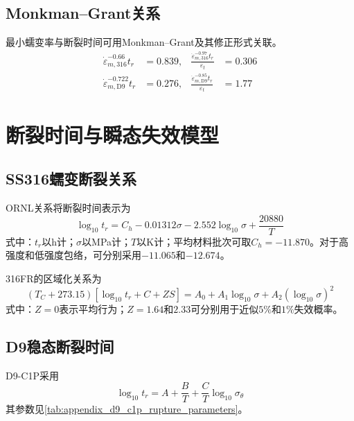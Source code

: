 \subsection{Monkman--Grant关系}

最小蠕变率与断裂时间可用Monkman--Grant及其修正形式关联。
\begin{equation}
	\label{eq:appendix_cladding_monkman_grant}
	\begin{aligned}
		\dot\varepsilon_{m,316}^{-0.66}t_r&=0.839,
		&
		\frac{\dot\varepsilon_{m,316}^{-0.97}t_r}{\varepsilon_t}&=0.306\\
		\dot\varepsilon_{m,\mathrm{D9}}^{-0.722}t_r&=0.276,
		&
		\frac{\dot\varepsilon_{m,\mathrm{D9}}^{-0.85}t_r}{\varepsilon_t}&=1.77
	\end{aligned}
\end{equation}


\section{断裂时间与瞬态失效模型}
\label{app:cladding_rupture_models}

\subsection{SS316蠕变断裂关系}

ORNL关系将断裂时间表示为\cite{brinkmanElevatedTemperatureMechanicalProperties2001}
\begin{equation}
	\log_{10}t_r
	=C_h-0.01312\sigma
	-2.552\log_{10}\sigma
	+\frac{20880}{T}
	\label{eq:appendix_ss316_ornl_rupture_time}
\end{equation}
式中：$t_r$以h计；$\sigma$以MPa计；$T$以K计；平均材料批次可取$C_h=-11.870$。对于高强度和低强度包络，可分别采用$-11.065$和$-12.674$。

316FR的区域化关系为\cite{OnizawaDevelopmentCreepProperty2019}
\begin{equation}
	(T_C+273.15)
	[\log_{10}t_r+C+ZS]
	=A_0+A_1\log_{10}\sigma
	+A_2(\log_{10}\sigma)^2
	\label{eq:appendix_316fr_rupture_time}
\end{equation}
式中：$Z=0$表示平均行为；$Z=1.64$和$2.33$可分别用于近似$5\%$和$1\%$失效概率。

\subsection{D9稳态断裂时间}

D9-C1P采用
\begin{equation}
	\log_{10}t_r
	=A+\frac{B}{T}
	+\frac{C}{T}\log_{10}\sigma_\theta
	\label{eq:appendix_d9_c1p_rupture_time}
\end{equation}
其参数见\tablename\ref{tab:appendix_d9_c1p_rupture_parameters}。

